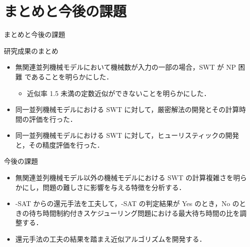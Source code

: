 \documentclass[dvipdfmx]{beamer}
\begin{document}
    \section{まとめと今後の課題}
    \begin{frame}{まとめと今後の課題}
      \begin{block}{研究成果のまとめ}
        \begin{itemize}
          \item 無関連並列機械モデルにおいて機械数が入力の一部の場合，SWT が \alert{NP 困難} であることを明らかにした．
          \begin{itemize}
            \item 近似率 1.5 未満の定数近似ができないことを明らかにした．
          \end{itemize}
          \item 同一並列機械モデルにおける SWT に対して，\alert{厳密解法}の開発とその\alert{計算時間の評価}を行った．
          \item 同一並列機械モデルにおける SWT に対して，\alert{ヒューリスティック}の開発と，その\alert{精度評価}を行った．
        \end{itemize}
      \end{block}
      \begin{alertblock}{今後の課題}
        \begin{itemize}
          \item 無関連並列機械モデル以外の機械モデルにおける SWT の計算複雑さを明らかにし，問題の難しさに影響を与える特徴を分析する．
          \item {-SAT} からの還元手法を工夫して，{-SAT} の判定結果が Yes のとき，No のときの待ち時間制約付きスケジューリング問題における最大待ち時間の比を調整する．
          \item 還元手法の工夫の結果を踏まえ近似アルゴリズムを開発する．
        \end{itemize}
      \end{alertblock}
    \end{frame}
    \begin{frame}

    \end{frame}
\end{document}
